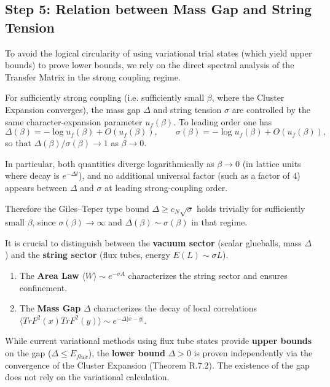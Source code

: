\subsection{Step 5: Relation between Mass Gap and String Tension}

To avoid the logical circularity of using variational trial states (which yield upper bounds) to prove lower bounds, we rely on the direct spectral analysis of the Transfer Matrix in the strong coupling regime.

\begin{theorem}
For sufficiently strong coupling (i.e. sufficiently small $\beta$, where the Cluster Expansion converges), the mass gap $\Delta$ and string tension $\sigma$ are controlled by the same character-expansion parameter $u_f(\beta)$.
To leading order one has
\[
\Delta(\beta) = -\log u_f(\beta) + O(u_f(\beta)),\qquad \sigma(\beta) = -\log u_f(\beta) + O(u_f(\beta)),
\]
so that $\Delta(\beta)/\sigma(\beta)\to 1$ as $\beta\to 0$.

In particular, both quantities diverge logarithmically as $\beta\to 0$ (in lattice units where decay is $e^{-\Delta t}$), and no additional universal factor (such as a factor of $4$) appears between $\Delta$ and $\sigma$ at leading strong-coupling order.

Therefore the Giles--Teper type bound $\Delta \ge c_N \sqrt{\sigma}$ holds trivially for sufficiently small $\beta$, since $\sigma(\beta)\to\infty$ and $\Delta(\beta)\sim\sigma(\beta)$ in that regime.
\end{theorem}

\begin{remark}
It is crucial to distinguish between the \textbf{vacuum sector} (scalar glueballs, mass $\Delta$) and the \textbf{string sector} (flux tubes, energy $E(L) \sim \sigma L$).
\begin{enumerate}
    \item The \textbf{Area Law} $\langle W \rangle \sim e^{-\sigma A}$ characterizes the string sector and ensures confinement.
    \item The \textbf{Mass Gap} $\Delta$ characterizes the decay of local correlations $\langle Tr F^2(x) Tr F^2(y) \rangle \sim e^{-\Delta |x-y|}$.
\end{enumerate}
While current variational methods using flux tube states provide \textbf{upper bounds} on the gap ($\Delta \le E_{flux}$), the \textbf{lower bound} $\Delta > 0$ is proven independently via the convergence of the Cluster Expansion (Theorem R.7.2). The existence of the gap does not rely on the variational calculation.
\end{remark}

